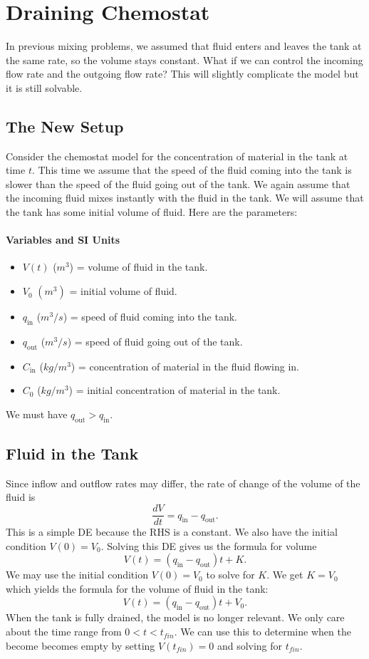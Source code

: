 \documentclass[10pt,letterpaper]{article}
\begin{document}
\section{Draining Chemostat}
In previous mixing problems, we assumed that fluid enters and leaves the tank at the same rate, so the volume stays constant. What if we can control the incoming flow rate and the outgoing flow rate? This will slightly complicate the model but it is still solvable.

\subsection*{The New Setup}
Consider the chemostat model for the concentration of material in the tank at time $t$. This time we assume that the speed of the fluid coming into the tank is slower than the speed of the fluid going out of the tank. We again assume that the incoming fluid mixes instantly with the fluid in the tank. We will assume that the tank has some initial volume of fluid. Here are the parameters:
\paragraph{Variables and SI Units}
\begin{itemize}
    \item $V(t)$ ($m^3$) = volume of fluid in the tank.
    \item $V_0$  $(m^3)$ = initial volume of fluid. 
    \item $q_{\text{in}}$ ($m^3/s$) = speed of fluid coming into the tank.
    \item $q_{\text{out}}$ ($m^3/s$) = speed of fluid going out of the tank.
    \item $C_{\text{in}}$ ($kg/m^3$)  = concentration of material in the fluid flowing in.
    \item $C_{0}$ ($kg/m^3$)  = initial concentration of material in the tank.
\end{itemize}
We must have $q_{\text{out}} > q_{\text{in}}$.

\subsection*{Fluid in the Tank}
Since inflow and outflow rates may differ, the rate of change of the volume of the fluid is 
$$
\frac{dV}{dt} = q_{\text{in}} - q_{\text{out}}.
$$
This is a simple DE because the RHS is a constant. We also have the initial condition $V(0)= V_0$. Solving this DE gives us the formula for volume
\[
V(t) = (q_{\text{in}} - q_{\text{out}})t +K.
\]
We may use the initial condition $V(0)=V_0$ to solve for $K$. We get $K=V_0$ which yields the formula for the volume of fluid in the tank:
\[
V(t) = (q_{\text{in}} - q_{\text{out}})t +V_0.
\]
When the tank is fully drained, the model is no longer relevant. We only care about the time range from $0<t<t_{fin}$. We can use this to determine when the become becomes empty by setting $V(t_{fin})=0$ and solving for $t_{fin}$. 
\end{document}
